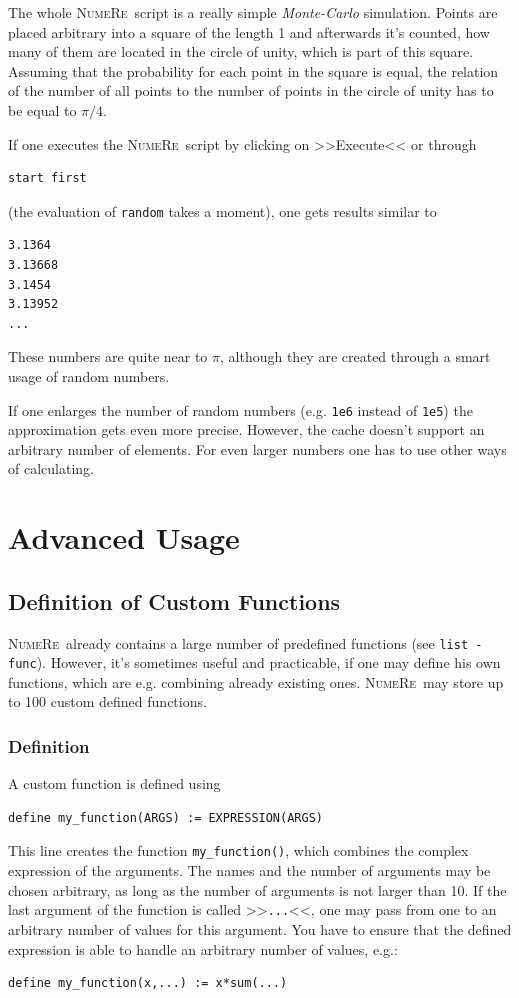 \documentclass[DIV=14,headsepline,footsepline]{scrbook}
\newcommand{\NR}{\textsc{Nu\-me\-Re}}
\begin{document}
				The whole \NR\ script is a really simple \emph{Monte-Carlo} simulation. Points are placed arbitrary into a square of the length 1 and afterwards it's counted, how many of them are located in the circle of unity, which is part of this square. Assuming that the probability for each point in the square is equal, the relation of the number of all points to the number of points in the circle of unity has to be equal to $\pi/4$.
				
				If one executes the \NR\ script by clicking on >>Execute<< or through
				\begin{lstlisting}
start first
				\end{lstlisting}
				(the evaluation of \verb+random+ takes a moment), one gets results similar to
				\begin{lstlisting}
3.1364
3.13668
3.1454
3.13952
...
				\end{lstlisting}
				These numbers are quite near to $\pi$, although they are created through a smart usage of random numbers.
				
				If one enlarges the number of random numbers (e.g. \verb+1e6+ instead of \verb+1e5+) the approximation gets even more precise. However, the cache doesn't support an arbitrary number of elements. For even larger numbers one has to use other ways of calculating.
	\part{Advanced Usage}
		\chapter{Definition of Custom Functions}
			\NR\ already contains a large number of predefined functions (see \verb+list -func+). However, it's sometimes useful and practicable, if one may define his own functions, which are e.g. combining already existing ones. \NR\ may store up to 100 custom defined functions.
			\section{Definition}
				A custom function is defined using
				\begin{lstlisting}
define my_function(ARGS) := EXPRESSION(ARGS)
				\end{lstlisting}
				This line creates the function \verb+my_function()+, which combines the complex expression of the arguments. The names and the number of arguments may be chosen arbitrary, as long as the number of arguments is not larger than 10. If the last argument of the function is called >>\verb+...+<<, one may pass from one to an arbitrary number of values for this argument. You have to ensure that the defined expression is able to handle an arbitrary number of values, e.g.:
				\begin{lstlisting}
define my_function(x,...) := x*sum(...)
				\end{lstlisting}
				
\end{document}
